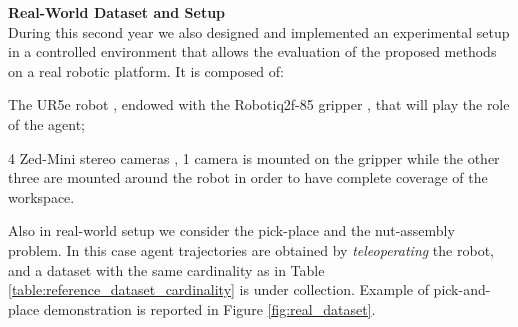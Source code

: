 \textbf{Real-World Dataset and Setup}  \mbox{} \\
During this second year we also designed and implemented an experimental setup in a controlled environment that allows the evaluation of the proposed methods on a real robotic platform. It is composed of:
\begin{itemize*}[label=$(\bullet)$]
    \item The UR5e robot \cite{ur5e}, endowed with the Robotiq2f-85 gripper \cite{robotiq}, that will play the role of the agent;
    \item 4 Zed-Mini stereo cameras \cite{zed}, 1 camera is mounted on the gripper while the other three are mounted around the robot in order to have complete coverage of the workspace.
\end{itemize*}
Also in real-world setup we consider the pick-place and the nut-assembly problem. In this case agent trajectories are obtained by \textit{teleoperating} the robot, and a dataset with the same cardinality as in Table \ref{table:reference_dataset_cardinality} is under collection. Example of pick-and-place demonstration is reported in Figure \ref{fig:real_dataset}.
